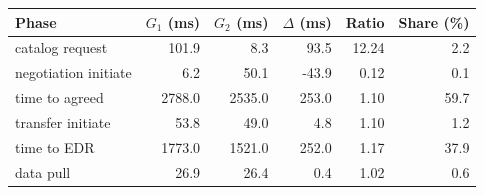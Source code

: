 \begin{tabular}{lrrrrr}
    \toprule
    Phase & $G_1$ (ms) & $G_2$ (ms) & $\Delta$ (ms) & Ratio & Share (\%) \\
    \midrule
    catalog request & 101.9 & 8.3 & 93.5 & 12.24 & 2.2 \\
    negotiation initiate & 6.2 & 50.1 & -43.9 & 0.12 & 0.1 \\
    time to agreed & 2788.0 & 2535.0 & 253.0 & 1.10 & 59.7 \\
    transfer initiate & 53.8 & 49.0 & 4.8 & 1.10 & 1.2 \\
    time to EDR & 1773.0 & 1521.0 & 252.0 & 1.17 & 37.9 \\
    data pull & 26.9 & 26.4 & 0.4 & 1.02 & 0.6 \\
    \bottomrule
\end{tabular}
